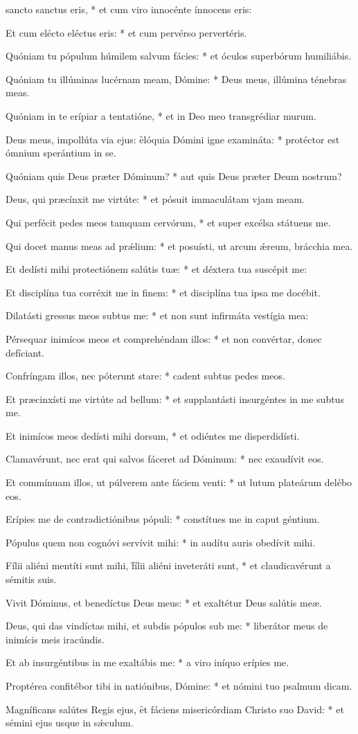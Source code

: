 \begin{psalmus}
 sancto sanctus eris, * et cum viro innocénte ínnocens eris:

Et cum elécto eléctus eris: * et cum pervérso pervertéris.

Quóniam tu pópulum húmilem salvum fácies: * et óculos superbórum humiliábis.

Quóniam tu illúminas lucérnam meam, Dómine: * Deus meus, illúmina ténebras meas.

Quóniam in te erípiar a tentatióne, * et in Deo meo transgrédiar murum.

Deus meus, impollúta via ejus: \f elóquia Dómini igne examináta: * protéctor est ómnium sperántium in se.

Quóniam quis Deus præter Dóminum? * aut quis Deus præter Deum nostrum?

Deus, qui præcínxit me virtúte: * et pósuit immaculátam vjam meam.

Qui perfécit pedes meos tamquam cervórum, * et super excélsa státuens me.

Qui docet manus meas ad prǽlium: * et posuísti, ut arcum ǽreum, brácchia mea.

Et dedísti mihi protectiónem salútis tuæ: * et déxtera tua suscépit me:

Et disciplína tua corréxit me in finem: * et disciplína tua ipsa me docébit.

Dilatásti gressus meos subtus me: * et non sunt infirmáta vestígia mea:

Pérsequar inimícos meos et comprehéndam illos: * et non convértar, donec defíciant.

Confríngam illos, nec póterunt stare: * cadent subtus pedes meos.

Et præcinxísti me virtúte ad bellum: * et supplantásti insurgéntes in me subtus me.

Et inimícos meos dedísti mihi dorsum, * et odiéntes me disperdidísti.

Clamavérunt, nec erat qui salvos fáceret ad Dóminum: * nec exaudívit eos.

Et commínuam illos, ut púlverem ante fáciem venti: * ut lutum plateárum delébo eos.

Erípies me de contradictiónibus pópuli: * constítues me in caput géntium.

Pópulus quem non cognóvi servívit mihi: * in audítu auris obedívit mihi.

Fílii aliéni mentíti sunt mihi, \f fílii aliéni inveteráti sunt, * et claudicavérunt a sémitis suis.

Vivit Dóminus, et benedíctus Deus meus: * et exaltétur Deus salútis meæ.

Deus, qui das vindíctas mihi, et subdis pópulos sub me: * liberátor meus de inimícis meis iracúndis.

Et ab insurgéntibus in me exaltábis me: * a viro iníquo erípies me.

Proptérea confitébor tibi in natiónibus, Dómine: * et nómini tuo psalmum dicam.

Magníficans salútes Regis ejus, \f et fáciens misericórdiam Christo suo David: * et sémini ejus usque in sǽculum.

\end{psalmus}
